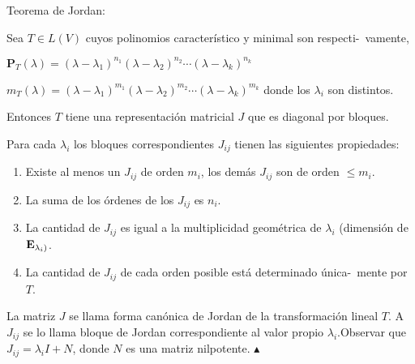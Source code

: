 \bigskip


\bigskip


\begin{corollary} {Teorema de Jordan:}


Sea $T\in L(V)$ cuyos polinomios característico y minimal son respecti-\ vamente, 

\bigskip

$\mathbf{P}_T (\lambda)=(\lambda-\lambda_1)^{n_1} (\lambda-\lambda_2)^{n_2}\cdots(\lambda-\lambda_k)^{n_k}$


\bigskip

$m_T(\lambda)=(\lambda-\lambda_1)^{m_1} (\lambda-\lambda_2)^{m_2}\cdots(\lambda-\lambda_k)^{m_k}$
\noindent
donde los $\lambda_i$ son distintos. 

\bigskip

Entonces $T$ tiene una representación matricial  $J$ que es diagonal por bloques. 

Para cada $\lambda_i$ los bloques correspondientes $J_{ij}$ tienen las siguientes propiedades:

 \begin{enumerate}
 
 \bigskip
 
\item Existe al menos un $J_{ij}$ de orden $m_i$, los demás  $J_{ij}$ son de orden $\leq m_i$.

\bigskip

\item La suma de los órdenes de los $J_{ij}$ es $n_i$.

\bigskip

\item  La cantidad de $J_{ij}$ es igual a la multiplicidad geométrica de $\lambda_i$ (dimensión de $\bold{E}_{\lambda_i)}$.

\bigskip


\item La cantidad de $J_{ij}$ de cada orden posible está determinado única-\ mente por $T$.


\end{enumerate}


\bigskip

\end{corollary}

\bigskip


\bigskip


\begin{remark}
La matriz  $J$ se llama forma canónica de Jordan de la transformación lineal  $T$. A $J_{ij}$ se lo llama bloque de Jordan correspondiente al valor propio $\lambda_i $.Observar que $J_{ij}=\lambda_iI + N$, donde $N$ es una matriz nilpotente.
\hfill$\blacktriangle$
\end{remark}

